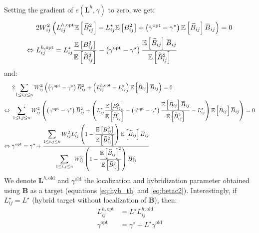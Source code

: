 \documentclass[12pt]{scrartcl}
\newcommand{\overbar}[1]{\mkern 1.5mu\overline{\mkern-1.5mu#1\mkern-1.5mu}\mkern 1.5mu}
\begin{document}
$  $\\
Setting the gradient of $e(\mathbf{L}^h,\gamma)$ to zero, we get:
\begin{align}
& 2 W_{ij}^2 \left(L^{h,\mathrm{opt}}_{ij} \mathbb{E} \left[\widetilde{B}_{ij}^2\right] - L_{ij}^\star \mathbb{E} \left[B^2_{ij}\right] + \left(\gamma^\mathrm{opt} - \gamma^\star \right) \mathbb{E} \left[\widetilde{B}_{ij}\right] \overbar{B}_{ij} \right) = 0 \nonumber \\
\Leftrightarrow \ & L^{h,\mathrm{opt}}_{ij} = L_{ij}^\star \frac{\mathbb{E} \left[B^2_{ij}\right]}{\mathbb{E} \left[\widetilde{B}_{ij}^2\right]} - \left(\gamma^\mathrm{opt} - \gamma^\star \right) \frac{\mathbb{E} \left[\widetilde{B}_{ij}\right] \overbar{B}_{ij}}{\mathbb{E} \left[\widetilde{B}_{ij}^2\right]}
\end{align}
and:
\begin{align}
& 2 \sum_{1 \le i,j \le n} W_{ij}^2 \left(\left(\gamma^\mathrm{opt} - \gamma^\star \right) \overbar{B}_{ij}^2 + \left(L^{h,\mathrm{opt}}_{ij} - L_{ij}^\star\right) \mathbb{E} \left[\widetilde{B}_{ij}\right] \overbar{B}_{ij} \right) = 0 \nonumber \\
\Leftrightarrow \ & \sum_{1 \le i,j \le n} W_{ij}^2 \left(\left(\gamma^\mathrm{opt} - \gamma^\star \right) \overbar{B}_{ij}^2 + \left(L_{ij}^\star \frac{\mathbb{E} \left[B^2_{ij}\right]}{\mathbb{E} \left[\widetilde{B}_{ij}^2\right]} - \left(\gamma^\mathrm{opt} - \gamma^\star \right) \frac{\mathbb{E} \left[\widetilde{B}_{ij}\right] \overbar{B}_{ij}}{\mathbb{E} \left[\widetilde{B}_{ij}^2\right]} - L_{ij}^\star\right) \mathbb{E} \left[\widetilde{B}_{ij}\right] \overbar{B}_{ij} \right) = 0 \nonumber \\
\Leftrightarrow \ & \gamma^\mathrm{opt} = \gamma^\star + \frac{\displaystyle \sum_{1 \le i,j \le n} W_{ij}^2 L_{ij}^\star \left(1 - \frac{\mathbb{E} \left[B^2_{ij}\right]}{\mathbb{E} \left[\widetilde{B}_{ij}^2\right]}\right) \mathbb{E}\left[ \widetilde{B}_{ij}\right] \overbar{B}_{ij}}{\displaystyle \sum_{1 \le i,j \le n} W_{ij}^2 \left(1 - \frac{\mathbb{E} \left[\widetilde{B}_{ij}\right]^2}{\mathbb{E}\left[ \widetilde{B}_{ij}^2 \right]}\right) \overbar{B}_{ij}^2}
\end{align}
We denote $\mathbf{L}^{h,\mathrm{old}}$ and $\gamma^\mathrm{old}$ the localization and hybridization parameter obtained using $\mathbf{B}$ as a target (equations \eqref{eq:hyb_th} and \eqref{eq:betac2}). Interestingly, if $L_{ij}^\star = L^\star$ (hybrid target without localization of $\mathbf{B}$), then:
\begin{subequations}
\begin{align}
L^{h,\mathrm{opt}}_{ij} & = L^\star L^{h,\mathrm{old}}_{ij} \\
\gamma^\mathrm{opt} & = \gamma^\star + L^\star \gamma^\mathrm{old}
\end{align}
\end{subequations}
\end{document}
